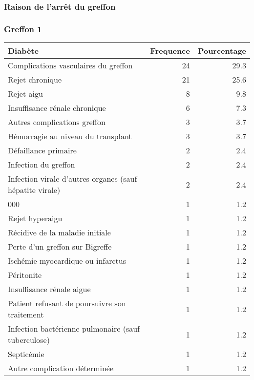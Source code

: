 \documentclass[11pt,a4paper]{article}\usepackage[]{graphicx}\usepackage[]{color}
\begin{document}
    \subsubsection{Raison de l'arrêt du greffon}

\subsubsection*{Greffon 1}

\begin{table}[H]
\centering
\begin{tabular}{lrr}
  \hline
Diabète & Frequence & Pourcentage \\ 
  \hline
Complications vasculaires du greffon & 24 & 29.3 \\ 
  Rejet chronique & 21 & 25.6 \\ 
  Rejet aigu & 8 & 9.8 \\ 
  Insuffisance rénale chronique & 6 & 7.3 \\ 
  Autres complications greffon & 3 & 3.7 \\ 
  Hémorragie au niveau du transplant & 3 & 3.7 \\ 
  Défaillance primaire & 2 & 2.4 \\ 
  Infection du greffon & 2 & 2.4 \\ 
  Infection virale d'autres organes (sauf hépatite virale) & 2 & 2.4 \\ 
  000 & 1 & 1.2 \\ 
  Rejet hyperaigu & 1 & 1.2 \\ 
  Récidive de la maladie initiale & 1 & 1.2 \\ 
  Perte d'un greffon sur Bigreffe & 1 & 1.2 \\ 
  Ischémie myocardique ou infarctus & 1 & 1.2 \\ 
  Péritonite & 1 & 1.2 \\ 
  Insuffisance rénale aigue & 1 & 1.2 \\ 
  Patient refusant de poursuivre son traitement & 1 & 1.2 \\ 
  Infection bactérienne pulmonaire (sauf tuberculose) & 1 & 1.2 \\ 
  Septicémie & 1 & 1.2 \\ 
  Autre complication déterminée & 1 & 1.2 \\ 
   \hline
\end{tabular}
\end{table}
\end{document}

